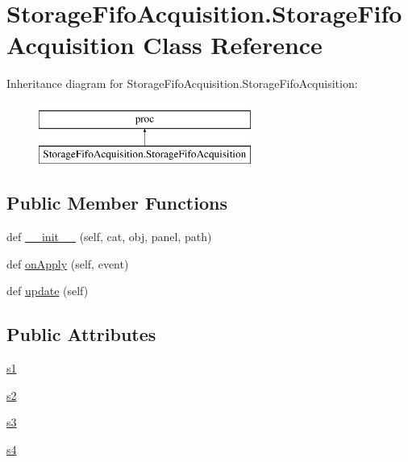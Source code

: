 \hypertarget{classStorageFifoAcquisition_1_1StorageFifoAcquisition}{}\section{Storage\+Fifo\+Acquisition.\+Storage\+Fifo\+Acquisition Class Reference}
\label{classStorageFifoAcquisition_1_1StorageFifoAcquisition}
Inheritance diagram for Storage\+Fifo\+Acquisition.\+Storage\+Fifo\+Acquisition\+:\begin{figure}[H]
\begin{center}
\leavevmode
\includegraphics[height=2.000000cm]{classStorageFifoAcquisition_1_1StorageFifoAcquisition}
\end{center}
\end{figure}
\subsection*{Public Member Functions}
\begin{DoxyCompactItemize}
\item 
def \hyperlink{classStorageFifoAcquisition_1_1StorageFifoAcquisition_aabce5452517625e2eac4392eb18a8364}{\+\_\+\+\_\+init\+\_\+\+\_\+} (self, cat, obj, panel, path)
\item 
def \hyperlink{classStorageFifoAcquisition_1_1StorageFifoAcquisition_a42ea0140c1ae56bcd5a6f4422f49bb13}{on\+Apply} (self, event)
\item 
def \hyperlink{classStorageFifoAcquisition_1_1StorageFifoAcquisition_ac668e50730d5b34daa15e82cbb37ae16}{update} (self)
\end{DoxyCompactItemize}
\subsection*{Public Attributes}
\begin{DoxyCompactItemize}
\item 
\hyperlink{classStorageFifoAcquisition_1_1StorageFifoAcquisition_a2d51e836bd19a5a06792f8f0e4bd1e62}{s1}
\item 
\hyperlink{classStorageFifoAcquisition_1_1StorageFifoAcquisition_af2adbf0c0e1b8cda0a0ef86d106fc1ed}{s2}
\item 
\hyperlink{classStorageFifoAcquisition_1_1StorageFifoAcquisition_a3f30efaf073827ff9317c275dcaafd55}{s3}
\item 
\hyperlink{classStorageFifoAcquisition_1_1StorageFifoAcquisition_acd6d6a44c3e9a6444997cc88748d7ab7}{s4}
\end{DoxyCompactItemize}


